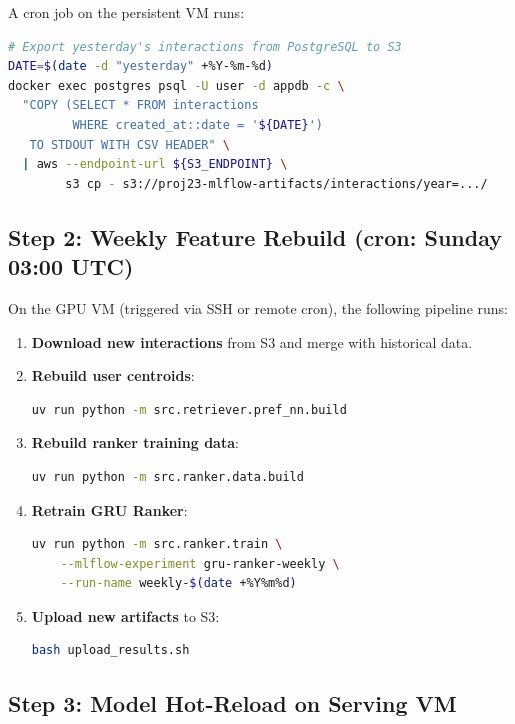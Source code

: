 \documentclass[11pt]{article}
\begin{document}
A cron job on the persistent VM runs:

\begin{lstlisting}[language=bash]
# Export yesterday's interactions from PostgreSQL to S3
DATE=$(date -d "yesterday" +%Y-%m-%d)
docker exec postgres psql -U user -d appdb -c \
  "COPY (SELECT * FROM interactions
         WHERE created_at::date = '${DATE}')
   TO STDOUT WITH CSV HEADER" \
  | aws --endpoint-url ${S3_ENDPOINT} \
        s3 cp - s3://proj23-mlflow-artifacts/interactions/year=.../
\end{lstlisting}

\subsection{Step 2: Weekly Feature Rebuild (cron: Sunday 03:00 UTC)}

On the GPU VM (triggered via SSH or remote cron), the following pipeline runs:

\begin{enumerate}[leftmargin=1.5em]
  \item \textbf{Download new interactions} from S3 and merge with historical data.
  \item \textbf{Rebuild user centroids}:
\begin{lstlisting}[language=bash]
uv run python -m src.retriever.pref_nn.build
\end{lstlisting}
  \item \textbf{Rebuild ranker training data}:
\begin{lstlisting}[language=bash]
uv run python -m src.ranker.data.build
\end{lstlisting}
  \item \textbf{Retrain GRU Ranker}:
\begin{lstlisting}[language=bash]
uv run python -m src.ranker.train \
    --mlflow-experiment gru-ranker-weekly \
    --run-name weekly-$(date +%Y%m%d)
\end{lstlisting}
  \item \textbf{Upload new artifacts} to S3:
\begin{lstlisting}[language=bash]
bash upload_results.sh
\end{lstlisting}
\end{enumerate}

\subsection{Step 3: Model Hot-Reload on Serving VM}
\end{document}
